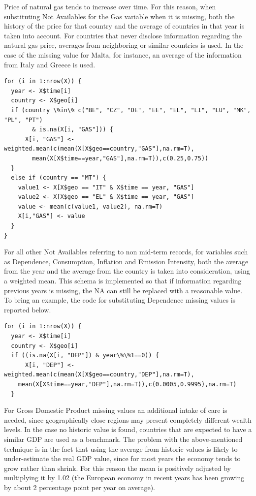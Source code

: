 \documentclass{book}
\begin{document}
\begin{appendices}
Price of natural gas tends to increase over time. For this reason, when substituting Not Availables for the Gas variable when it is missing, both the history of the price for that country and the average of countries in that year is taken into account. For countries that never disclose information regarding the natural gas price, averages from neighboring or similar countries is used. In the case of the missing value for Malta, for instance, an average of the information from Italy and Greece is used.

\begin{verbatim}
for (i in 1:nrow(X)) {
  year <- X$time[i]
  country <- X$geo[i]
  if (country \%in\% c("BE", "CZ", "DE", "EE", "EL", "LI", "LU", "MK", "PL", "PT") 
		& is.na(X[i, "GAS"])) {
      X[i, "GAS"] <- weighted.mean(c(mean(X[X$geo==country,"GAS"],na.rm=T),
		mean(X[X$time==year,"GAS"],na.rm=T)),c(0.25,0.75))
  }
  else if (country == "MT") {
    value1 <- X[X$geo == "IT" & X$time == year, "GAS"]
    value2 <- X[X$geo == "EL" & X$time == year, "GAS"]
    value <- mean(c(value1, value2), na.rm=T)
    X[i,"GAS"] <- value
  }
}
\end{verbatim}

For all other Not Availables referring to non mid-term records, for variables such as Dependence, Consumption, Inflation and Emission Intensity, both the average from the year and the average from the country is taken into consideration, using a weighted mean. This schema is implemented so that if information regarding previous years is missing, the NA can still be replaced with a reasonable value. To bring an example, the code for substituting Dependence missing values is reported below.

\begin{verbatim}
for (i in 1:nrow(X)) {
  year <- X$time[i]
  country <- X$geo[i]
  if ((is.na(X[i, "DEP"]) & year\%\%1==0)) {
      X[i, "DEP"] <- weighted.mean(c(mean(X[X$geo==country,"DEP"],na.rm=T),
	mean(X[X$time==year,"DEP"],na.rm=T)),c(0.0005,0.9995),na.rm=T)
  }
\end{verbatim}

For Gross Domestic Product missing values an additional intake of care is needed, since geographically close regions may present completely different wealth levels. In the case no historic value is found, countries that are expected to have a similar GDP are used as a benchmark. The problem with the above-mentioned technique is in the fact that using the average from historic values is likely to under-estimate the real GDP value, since for most years the economy tends to grow rather than shrink. For this reason the mean is positively adjusted by multiplying it by 1.02 (the European economy in recent years has been growing by about 2 percentage point per year on average).


\end{appendices}
\end{document}
